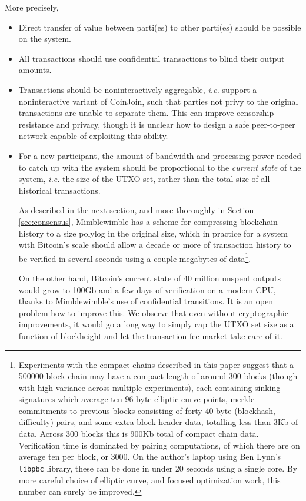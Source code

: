 \documentclass[letterpaper]{article}
\begin{document}
More precisely,
\begin{itemize}
\item Direct transfer of value between parti(es) to other parti(es)
should be possible on the system.

\item All transactions should use confidential transactions
to blind their output amounts.

\item Transactions should be noninteractively aggregable\cite{mouton2013},
\emph{i.e.} support a noninteractive variant of CoinJoin\cite{maxwell2013,maxwell2013-2},
such that parties not privy to the original transactions are unable to
separate them. This can improve censorship resistance and privacy,
though it is unclear how to design a safe peer-to-peer network capable
of exploiting this ability.

\item For a new participant, the amount of bandwidth and processing power
needed to catch up with the system should be proportional to the \emph{current
state} of the system, \emph{i.e.} the size of the UTXO set, rather than
the total size of all historical transactions.

As described in the next section, and more thoroughly in Section
\ref{sec:consensus}, Mimblewimble has a scheme for compressing blockchain
history to a size polylog in the original size, which in practice for a
system with Bitcoin's scale should allow a decade or more of transaction
history to be verified in several seconds using a couple megabytes of data\footnote{Experiments
with the compact chains described in this paper suggest that a 500000
block chain may have a compact length of around 300 blocks (though with
high variance across multiple experiments), each containing sinking
signatures which average ten 96-byte elliptic curve points, merkle
commitments to previous blocks consisting of forty 40-byte (blockhash,
difficulty) pairs, and some extra block header data, totalling less
than 3Kb of data. Across 300 blocks this is 900Kb total of compact
chain data. Verification time is dominated by pairing computations,
of which there are on average ten per block, or 3000. On the author's
laptop using Ben Lynn's \texttt{libpbc} library, these can be done
in under 20 seconds using a single core. By more careful choice of
elliptic curve, and focused optimization work, this number can surely
be improved.}.

On the other hand, Bitcoin's current state of 40 million unspent outputs
would grow to 100Gb and a few days of verification on a modern CPU, thanks
to Mimblewimble's use of confidential transitions. It is an open problem
how to improve this. We observe that even without cryptographic improvements,
it would go a long way to simply cap the UTXO set size as a function of
blockheight and let the transaction-fee market take care of it.
\end{itemize}
\end{document}
